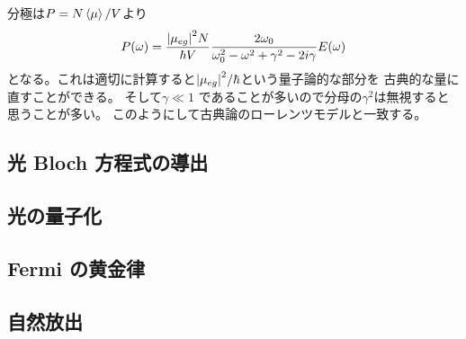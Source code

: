 \documentclass[11pt,dvipdfmx,a4paper]{jsarticle}
\begin{document}
分極は\(P=N\ev{\mu}/V\)より
\begin{equation}
	P(\omega) = \frac{\abs{\mu_{eg}}^2N}{\hbar V}
	\frac{2\omega_0}{\omega_0^2-\omega^2 + \gamma^2 -2i\gamma}E(\omega)
\end{equation}
となる。これは適切に計算すると\(\abs{\mu_{eg}}^2/\hbar\)という量子論的な部分を
古典的な量に直すことができる。
そして\(\gamma \ll 1\) であることが多いので分母の\(\gamma^2\)は無視すると思うことが多い。
このようにして古典論のローレンツモデルと一致する。


\subsection{光 Bloch 方程式の導出}

\subsection{光の量子化}

\subsection{Fermi の黄金律}

\subsection{自然放出}
\end{document}
